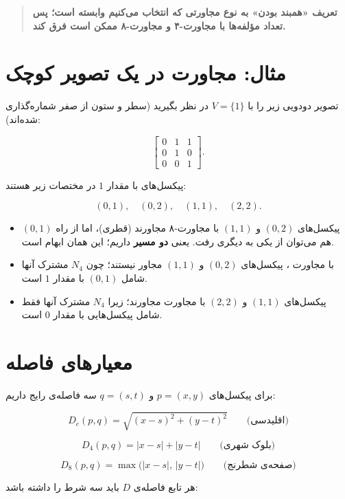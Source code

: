 \documentclass[11pt,a4paper]{article}
\begin{document}
	\begin{quote}
		\textbf{تعریف «همبند بودن» به نوع مجاورتی که انتخاب می‌کنیم وابسته است؛
			پس تعداد مؤلفه‌ها با مجاورت-۴ و مجاورت-۸ ممکن است فرق کند.}
	\end{quote}
	
	
	\section{مثال: مجاورت در یک تصویر کوچک}
	
	تصویر دودویی زیر را با $V=\{1\}$ در نظر بگیرید (سطر و ستون از صفر شماره‌گذاری شده‌اند):
	
	\[
	\begin{bmatrix}
		0 & 1 & 1\\
		0 & 1 & 0\\
		0 & 0 & 1
	\end{bmatrix}.
	\]
	
	پیکسل‌های با مقدار $1$ در مختصات زیر هستند:
	
	\[
	(0,1),\quad(0,2),\quad(1,1),\quad(2,2).
	\]
	
	\begin{itemize}
		\item پیکسل‌های $(0,2)$ و $(1,1)$ با مجاورت-۸ مجاورند (قطری)، اما از راه $(0,1)$ هم
		می‌توان از یکی به دیگری رفت. یعنی \textbf{دو مسیر} داریم؛ این همان ابهام است.
		\item با مجاورت ، پیکسل‌های $(0,2)$ و $(1,1)$ مجاور نیستند؛ چون
		$N_4$ مشترک آنها شامل $(0,1)$ با مقدار $1$ است.
		\item پیکسل‌های $(1,1)$ و $(2,2)$ با مجاورت  مجاورند؛ زیرا
		$N_4$ مشترک آنها فقط شامل پیکسل‌هایی با مقدار $0$ است.
	\end{itemize}
	
	
	\section{معیارهای فاصله}
	
	برای پیکسل‌های $p=(x,y)$ و $q=(s,t)$ سه فاصله‌ی رایج داریم:
	
	\[
	D_e(p,q)=\sqrt{(x-s)^2+(y-t)^2}
	\qquad\text{(اقلیدسی)}
	\]
	
	\[
	D_4(p,q)=|x-s|+|y-t|
	\qquad\text{(بلوک شهری)}
	\]
	
	\[
	D_8(p,q)=\max\big(|x-s|,\,|y-t|\big)
	\qquad\text{(صفحه‌ی شطرنج)}
	\]
	
	هر تابع فاصله‌ی $D$ باید سه شرط را داشته باشد:
	
\end{document}
